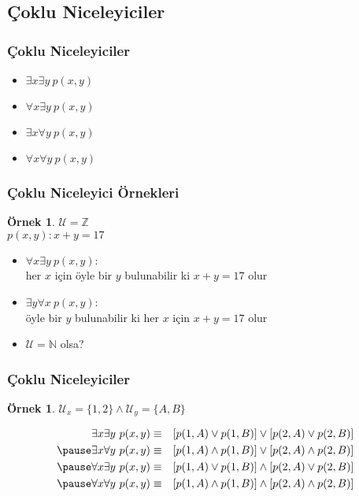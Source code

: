 \documentclass[dvipsnames]{beamer}
\theoremstyle{definition}
\theoremstyle{example}
\newtheorem{ornek}[theorem]{Örnek}
\theoremstyle{plain}
\begin{document}
\subsection{Çoklu Niceleyiciler}

\begin{frame}
  \frametitle{Çoklu Niceleyiciler}

  \begin{itemize}
    \item $\exists x \exists y~p(x,y)$
    \item $\forall x \exists y~p(x,y)$
    \item $\exists x \forall y~p(x,y)$
    \item $\forall x \forall y~p(x,y)$
  \end{itemize}
\end{frame}

\begin{frame}
  \frametitle{Çoklu Niceleyici Örnekleri}

  \begin{ornek}
    $\mathcal{U}=\mathbb{Z}$\\
    $p(x,y): x+y=17$

    \begin{itemize}
      \pause
      \item $\forall x \exists y~p(x,y)$:\\
        her $x$ için öyle bir $y$ bulunabilir ki $x+y=17$ olur

      \pause
      \item $\exists y \forall x~p(x,y)$:\\
        öyle bir $y$ bulunabilir ki her $x$ için $x+y=17$ olur

      \pause
      \bigskip
      \item $\mathcal{U}=\mathbb{N}$ olsa?
    \end{itemize}
  \end{ornek}
\end{frame}

\begin{frame}
  \frametitle{Çoklu Niceleyiciler}

  \begin{ornek}
    $\mathcal{U}_x = \{1,2\} \wedge \mathcal{U}_y = \{A,B\}$

    \pause
    \begin{eqnarray*}
      \exists x \exists y~p(x,y) & \equiv & [p(1,A) \vee p(1,B)]
                                       \vee [p(2,A) \vee p(2,B)]\\\pause
      \exists x \forall y~p(x,y) & \equiv & [p(1,A) \wedge p(1,B)]
                                       \vee [p(2,A) \wedge p(2,B)]\\\pause
      \forall x \exists y~p(x,y) & \equiv & [p(1,A) \vee p(1,B)]
                                     \wedge [p(2,A) \vee p(2,B)]\\\pause
      \forall x \forall y~p(x,y) & \equiv & [p(1,A) \wedge p(1,B)]
                                     \wedge [p(2,A) \wedge p(2,B)]
    \end{eqnarray*}
  \end{ornek}
\end{frame}
\end{document}
